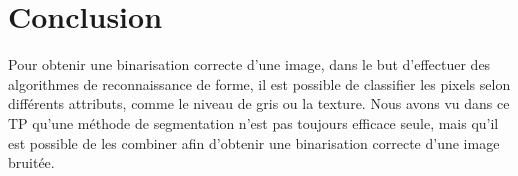 \documentclass[11pt]{article}
\begin{document}
  \section*{Conclusion}
  Pour obtenir une binarisation correcte d'une image, dans le but d'effectuer des algorithmes de reconnaissance de forme, il est possible
  de classifier les pixels selon différents attributs, comme le niveau de gris ou la texture. Nous avons vu dans ce TP qu'une méthode de 
  segmentation n'est pas toujours efficace seule, mais qu'il est possible de les combiner afin d'obtenir une binarisation correcte 
  d'une image bruitée.
\end{document}

